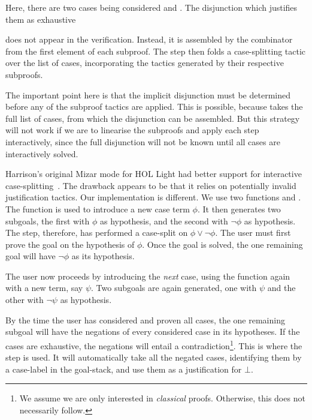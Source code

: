 {\samepage Here, there are two cases being considered  and . The disjunction which justifies them as exhaustive
\begin{center}\end{center}}

\noindent does not appear in the verification. Instead, it is assembled by the  combinator from the first element of each subproof. The step then folds a case-splitting tactic over the list of cases, incorporating the tactics generated by their respective subproofs.

The important point here is that the implicit disjunction must be determined before any of the subproof tactics are applied. This is possible, because  takes the full list of cases, from which the disjunction can be assembled. But this strategy will not work if we are to linearise the subproofs and apply each step interactively, since the full disjunction will not be known until all cases are interactively solved.

Harrison's original Mizar mode for HOL Light had better support for interactive case-splitting~\cite{MizarHOL}. The drawback appears to be that it relies on potentially invalid justification tactics. Our implementation is different. We use two functions  and . The  function is used to introduce a new case term $\phi$. It then generates two subgoals, the first with $\phi$ as hypothesis, and the second with $\neg\phi$ as hypothesis. The  step, therefore, has performed a case-split on $\phi\vee\neg\phi$. The user must first prove the goal on the hypothesis of $\phi$. Once the goal is solved, the one remaining goal will have $\neg\phi$ as its hypothesis.

The user now proceeds by introducing the \emph{next} case, using the  function again with a new term, say $\psi$. Two subgoals are again generated, one with $\psi$ and the other with $\neg\psi$ as hypothesis.

By the time the user has considered and proven all cases, the one remaining subgoal will have the negations of every considered case in its hypotheses. If the cases are exhaustive, the negations will entail a contradiction\footnote{We assume we are only interested in \emph{classical} proofs. Otherwise, this does not necessarily follow.}. This is where the  step is used. It will automatically take all the negated cases, identifying them by a case-label  in the goal-stack, and use them as a justification for $\bot$.

